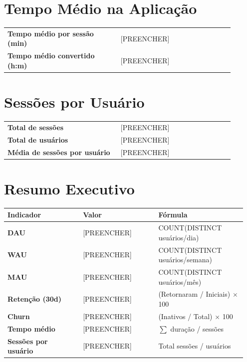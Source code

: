 \documentclass[12pt]{article}
\providecommand{\DAUmedio}{[PREENCHER]}
\providecommand{\WAUMedio}{[PREENCHER]}
\providecommand{\MAU}{[PREENCHER]}
\providecommand{\RetencaoTaxa}{[PREENCHER]}
\providecommand{\ChurnTaxa}{[PREENCHER]}
\providecommand{\TempoMedioMin}{[PREENCHER]}
\providecommand{\TempoMedioHM}{[PREENCHER]}
\providecommand{\TotalSessoes}{[PREENCHER]}
\providecommand{\TotalUsuarios}{[PREENCHER]}
\providecommand{\SessoesPorUsuario}{[PREENCHER]}
\begin{document}
\section*{Tempo Médio na Aplicação}
\begin{center}
\begin{tabular}{>{\bfseries}p{0.45\linewidth} p{0.45\linewidth}}
\toprule
Tempo médio por sessão (min) & \TempoMedioMin \\
Tempo médio convertido (h:m) & \TempoMedioHM \\
\bottomrule
\end{tabular}
\end{center}

\section*{Sessões por Usuário}
\begin{center}
\begin{tabular}{>{\bfseries}p{0.45\linewidth} p{0.45\linewidth}}
\toprule
Total de sessões & \TotalSessoes \\
Total de usuários & \TotalUsuarios \\
Média de sessões por usuário & \SessoesPorUsuario \\
\bottomrule
\end{tabular}
\end{center}

\section*{Resumo Executivo}
\begin{center}
\begin{tabular}{>{\bfseries}p{0.3\linewidth} p{0.3\linewidth} p{0.35\linewidth}}
\toprule
Indicador & Valor & Fórmula \\
\midrule
DAU & \DAUmedio & COUNT(DISTINCT usuários/dia) \\
WAU & \WAUMedio & COUNT(DISTINCT usuários/semana) \\
MAU & \MAU & COUNT(DISTINCT usuários/mês) \\
Retenção (30d) & \RetencaoTaxa & (Retornaram / Iniciais) $\times$ 100 \\
Churn & \ChurnTaxa & (Inativos / Total) $\times$ 100 \\
Tempo médio & \TempoMedioHM & $\sum$ duração / sessões \\
Sessões por usuário & \SessoesPorUsuario & Total sessões / usuários \\
\bottomrule
\end{tabular}
\end{center}
\end{document}

